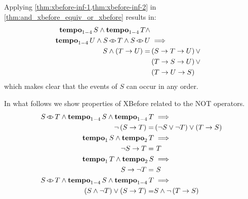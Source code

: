Applying \cref{thm:xbefore-inf-1,thm:xbefore-inf-2} in \cref{thm:and_xbefore_equiv_or_xbefore} results in:
%
\begin{align}
\tempo{S} \land \tempo{T} \land \nonumber\\
  \tempo{U} \land \independentevents{S}{T} \land \independentevents{S}{U} & \implies \nonumber\\
  S \land \parsin{\xbefore{T}{U}} = &
  \parsin{\xbefore{\xbefore{S}{T}}{U}} \lor \nonumber\\
  & \parsin{\xbefore{\xbefore{T}{S}}{U}} \lor \nonumber\\
  & \parsin{\xbefore{\xbefore{T}{U}}{S}} 
  \label{thm:and_xbefore_equiv_or_xbefore_expanded}
%
%
%
\end{align}
%
which makes clear that the events of $S$ can occur in any order.
%


In what follows we show properties of \ac{XBefore} related to the \ac{NOT} operators.
%
\begin{subequations}
\label{thms:xbefore-not}
\begin{align}
\independentevents{S}{T} \land
\tempo[1-4]{S} \land \tempo[1-4]{T} & \implies \nonumber\\
  \lnot \left(\xbefore{S}{T}\right) =&
  \left(\lnot S \lor \lnot T\right) \lor \left(\xbefore{T}{S}\right)
  \label{thm:not_xbefore}\\
\tempo[1]{S} \land \tempo[2]{T} & \implies \nonumber\\
  \xbefore{\lnot S}{T} = &~ T\label{thm:not_1_xbefore_equiv}\\
\tempo[1]{T} \land \tempo[2]{S} & \implies \nonumber\\
  \xbefore{S}{\lnot T} = &~ S\label{thm:not_2_xbefore_equiv}\\
\independentevents{S}{T} \land \tempo[1-4]{S} \land \tempo[1-4]{T} & \implies\nonumber\\
  \left(S \land \lnot T\right) \lor \left(\xbefore{S}{T}\right) = &
  S \land \lnot\left(\xbefore{T}{S} \right)
  \label{thm:xbefore_sup_compl_inf_absorb1}
\end{align}
\end{subequations}

